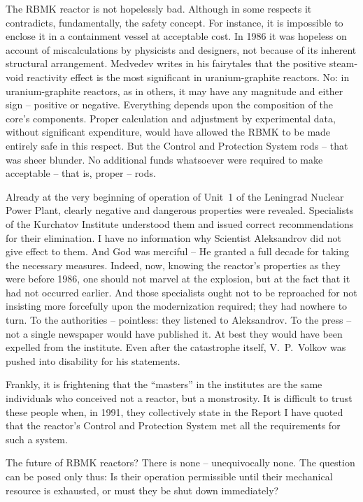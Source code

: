 \documentclass[openright]{bookest}
\begin{document}
The RBMK reactor is not hopelessly bad. Although in some respects it contradicts, fundamentally, the safety concept. For instance, it is impossible to enclose it in a containment vessel at acceptable cost. In 1986 it was hopeless on account of miscalculations by physicists and designers, not because of its inherent structural arrangement. Medvedev writes in his fairytales that the positive steam-void reactivity effect is the most significant in uranium-graphite reactors. No: in uranium-graphite reactors, as in others, it may have any magnitude and either sign -- positive or negative. Everything depends upon the composition of the core's components. Proper calculation and adjustment by experimental data, without significant expenditure, would have allowed the RBMK to be made entirely safe in this respect. But the Control and Protection System rods -- that was sheer blunder. No additional funds whatsoever were required to make acceptable -- that is, proper -- rods.

Already at the very beginning of operation of Unit~1 of the Leningrad Nuclear Power Plant, clearly negative and dangerous properties were revealed. Specialists of the Kurchatov Institute understood them and issued correct recommendations for their elimination. I have no information why Scientist Aleksandrov did not give effect to them. And God was merciful -- He granted a full decade for taking the necessary measures. Indeed, now, knowing the reactor's properties as they were before 1986, one should not marvel at the explosion, but at the fact that it had not occurred earlier. And those specialists ought not to be reproached for not insisting more forcefully upon the modernization required; they had nowhere to turn. To the authorities -- pointless: they listened to Aleksandrov. To the press -- not a single newspaper would have published it. At best they would have been expelled from the institute. Even after the catastrophe itself, V.~P.~Volkov was pushed into disability for his statements.

Frankly, it is frightening that the ``masters'' in the institutes are the same individuals who conceived not a reactor, but a monstrosity. It is difficult to trust these people when, in 1991, they collectively state in the Report I have quoted that the reactor's Control and Protection System met all the requirements for such a system.

The future of RBMK reactors? There is none -- unequivocally none. The question can be posed only thus: Is their operation permissible until their mechanical resource is exhausted, or must they be shut down immediately?
\end{document}
